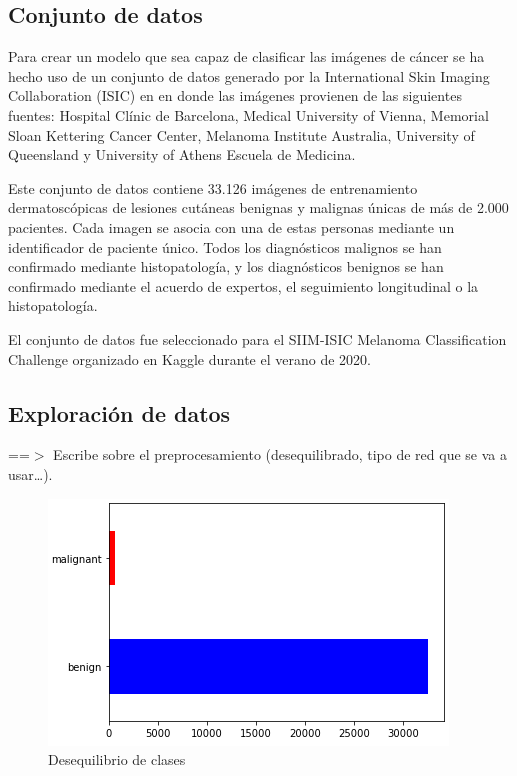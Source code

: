 \subsection{Conjunto de datos}
Para crear un modelo que sea capaz de clasificar las imágenes de cáncer se ha hecho uso de un conjunto de datos generado por la International Skin Imaging Collaboration (ISIC) en en donde las imágenes provienen de las siguientes fuentes: Hospital Clínic de Barcelona, Medical University of Vienna, Memorial Sloan Kettering Cancer Center, Melanoma Institute Australia, University of Queensland y University of Athens Escuela de Medicina.
\bigskip

Este conjunto de datos contiene 33.126 imágenes de entrenamiento dermatoscópicas de lesiones cutáneas benignas y malignas únicas de más de 2.000 pacientes. Cada imagen se asocia con una de estas personas mediante un identificador de paciente único. Todos los diagnósticos malignos se han confirmado mediante histopatología, y los diagnósticos benignos se han confirmado mediante el acuerdo de expertos, el seguimiento longitudinal o la histopatología. 
\bigskip

El conjunto de datos fue seleccionado para el SIIM-ISIC Melanoma Classification Challenge organizado en Kaggle durante el verano de 2020.
\bigskip

\newpage
\pagestyle{fancy}
\fancyhf{}

\subsection{Exploración de datos}
==$>$ Escribe sobre el preprocesamiento (desequilibrado, tipo de red que se va a usar…).

\begin{figure}[htbp]
    \centering
    \textbf{}\par\medskip
    \includegraphics[scale=0.90]{figures/metadata/imbalance_class.PNG}
    \caption{Desequilibrio de clases}
\end{figure}

